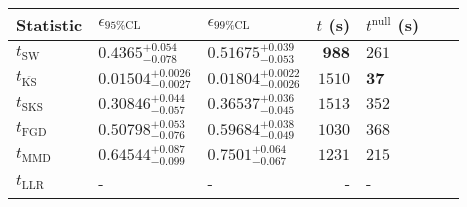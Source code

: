 \begin{tabular}{l|llr|llr}
	Statistic & $\epsilon_{95\%\mathrm{CL}}$ & $\epsilon_{99\%\mathrm{CL}}$ & $t$ (s) & $t^{\mathrm{null}}$ (s) \\
	\midrule
	$t_{\mathrm{SW}}$ & $0.4365_{-0.078}^{+0.054}$ & $0.51675_{-0.053}^{+0.039}$ & ${\mathbf{988}}$ & $261$ \\
	$t_{\overline{\mathrm{KS}}}$ & ${\mathbf{0.01504_{-0.0027}^{+0.0026}}}$ & ${\mathbf{0.01804_{-0.0026}^{+0.0022}}}$ & $1510$ & ${\mathbf{37}}$ \\
	$t_{\mathrm{SKS}}$ & $0.30846_{-0.057}^{+0.044}$ & $0.36537_{-0.045}^{+0.036}$ & $1513$ & $352$ \\
	$t_{\mathrm{FGD}}$ & $0.50798_{-0.076}^{+0.053}$ & $0.59684_{-0.049}^{+0.038}$ & $1030$ & $368$ \\
	$t_{\mathrm{MMD}}$ & $0.64544_{-0.099}^{+0.087}$ & $0.7501_{-0.067}^{+0.064}$ & $1231$ & $215$ \\
	$t_{\mathrm{LLR}}$ & - & - & - & - \\
	\bottomrule
\end{tabular}